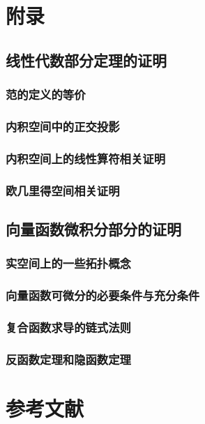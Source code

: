 \documentclass[zihao=-4,linespread=1.5,a4paper,heading=true,twoside]{ctexbook}
\theoremstyle{definition}
\theoremstyle{plain}
\begin{document}
\appendix
\newpage\part{附录}
\chapter{线性代数部分定理的证明}\label{sec:A}
\section{范的定义的等价}\label{sec:A.1}


\section{内积空间中的正交投影}\label{sec:A.2}


\section{内积空间上的线性算符相关证明}\label{sec:A.3}


\section{欧几里得空间相关证明}\label{sec:A.4}


\chapter{向量函数微积分部分的证明}\label{sec:B}
\section{实空间上的一些拓扑概念}\label{sec:B.1}


\section{向量函数可微分的必要条件与充分条件}\label{sec:B.2}


\section{复合函数求导的链式法则}\label{sec:B.3}


\section{反函数定理和隐函数定理}\label{sec:B.4}


%

%
% 

\newpage\part*{参考文献}
\printbibliography[heading=none]
\end{document}
